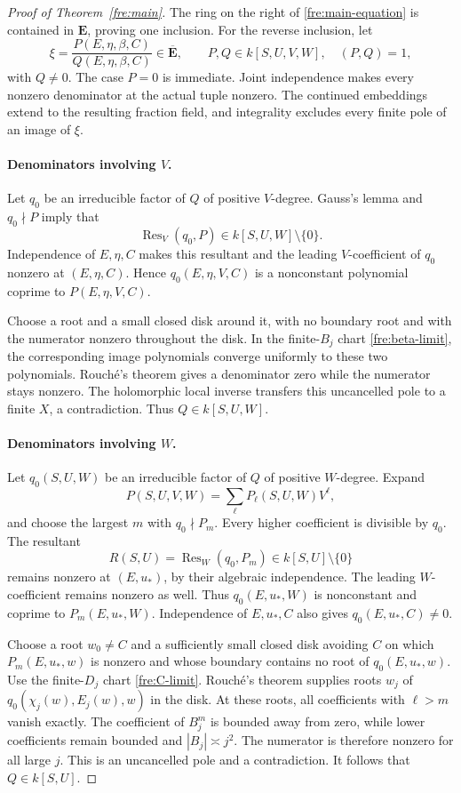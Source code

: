 \documentclass[11pt]{article}
\theoremstyle{definition}
\theoremstyle{remark}
\begin{document}
\begin{proof}[Proof of Theorem~\ref{fre:main}]
The ring on the right of \eqref{fre:main-equation} is contained in
$\mathbf E$, proving one inclusion.  For the reverse inclusion, let
\[
 \xi=\frac{P(E,\eta,\beta,C)}{Q(E,\eta,\beta,C)}
 \in\overline{\mathbf E},
 \qquad P,Q\in k[S,U,V,W],\quad (P,Q)=1,
\]
with $Q\ne0$.  The case $P=0$ is immediate.  Joint independence
makes every nonzero denominator at the actual tuple nonzero.  The
continued embeddings extend to the resulting fraction field, and
integrality excludes every finite pole of an image of $\xi$.

\paragraph{Denominators involving $V$.}
Let $q_0$ be an irreducible factor of $Q$ of positive $V$-degree.
Gauss's lemma and $q_0\nmid P$ imply that
\[
 \operatorname{Res}_V(q_0,P)
      \in k[S,U,W]\setminus\{0\}.
\]
Independence of $E,\eta,C$ makes this resultant and the leading
$V$-coefficient of $q_0$ nonzero at $(E,\eta,C)$.
Hence $q_0(E,\eta,V,C)$ is a nonconstant polynomial coprime to
$P(E,\eta,V,C)$.

Choose a root and a small closed disk around it, with no boundary
root and with the numerator nonzero throughout the disk.  In the
finite-$B_j$ chart \eqref{fre:beta-limit}, the corresponding image
polynomials converge uniformly to these two polynomials.  Rouch\'e's
theorem gives a denominator zero while the numerator stays nonzero.
The holomorphic local inverse transfers this uncancelled pole to a
finite $X$, a contradiction.  Thus $Q\in k[S,U,W]$.

\paragraph{Denominators involving $W$.}
Let $q_0(S,U,W)$ be an irreducible factor of $Q$ of positive
$W$-degree.  Expand
\[
 P(S,U,V,W)=\sum_\ell P_\ell(S,U,W)V^\ell,
\]
and choose the largest $m$ with $q_0\nmid P_m$.  Every higher
coefficient is divisible by $q_0$.  The resultant
\[
 R(S,U)=\operatorname{Res}_W(q_0,P_m)
          \in k[S,U]\setminus\{0\}
\]
remains nonzero at $(E,u_*)$, by their algebraic independence.
The leading $W$-coefficient remains nonzero as well.  Thus
$q_0(E,u_*,W)$ is nonconstant and coprime to $P_m(E,u_*,W)$.
Independence of $E,u_*,C$ also gives $q_0(E,u_*,C)\ne0$.

Choose a root $w_0\ne C$ and a sufficiently small closed disk
avoiding $C$ on which $P_m(E,u_*,w)$ is nonzero and whose boundary
contains no root of $q_0(E,u_*,w)$.  Use the finite-$D_j$ chart
\eqref{fre:C-limit}.  Rouch\'e's theorem supplies roots $w_j$ of
$q_0(\chi_j(w),E_j(w),w)$ in the disk.  At these roots, all
coefficients with $\ell>m$ vanish exactly.  The coefficient of
$B_j^m$ is bounded away from zero, while lower coefficients remain
bounded and $|B_j|\asymp j^2$.  The numerator is therefore nonzero
for all large $j$.  This is an uncancelled pole and a contradiction.
It follows that $Q\in k[S,U]$.


\end{proof}
\end{document}
